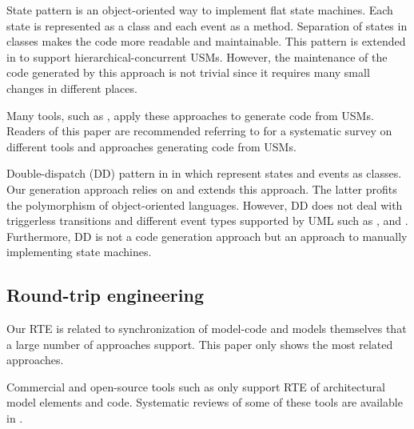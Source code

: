 State pattern \cite{Shalyto2006,Douglass1999} is an object-oriented way to implement flat state machines. Each state is represented as a class and each event as a method. %
Separation of states in classes makes the code more readable and maintainable. %
This pattern is extended in \cite{niaz_mapping_2004} to support hierarchical-concurrent USMs. However, the maintenance of the code generated by this approach is not trivial since it requires many small changes in different places. %

Many tools, such as \cite{ibm_rhapsody, sparxsystems_enterprise_2014}, apply these approaches to generate code from USMs. Readers of this paper are recommended referring to \cite{Domnguez2012} for a systematic survey on different tools and approaches generating code from USMs.

Double-dispatch (DD) pattern in \cite{spinke_object-oriented_2013} in which %
represent states and events as classes. Our generation approach relies on and extends this approach. The latter profits the polymorphism of object-oriented languages. %
However, DD does not deal with triggerless transitions and different event types supported by UML such as ,  and . Furthermore, DD is not a code generation approach but an approach to manually implementing state machines.

\subsection{Round-trip engineering}
Our RTE is related to synchronization of model-code and models themselves that a large number of approaches support. This paper only shows the most related approaches. 

\noindent
{}

Commercial and open-source tools such as \cite{sparxsystems_enterprise_2014, ibm_rhapsody} only support RTE of architectural model elements and code.
Systematic reviews of some of these tools are available in \cite{Cutting2015}.

